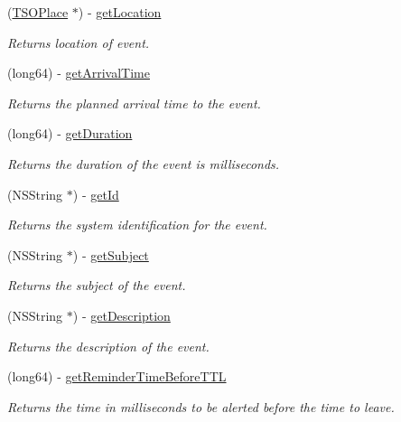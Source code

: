 \begin{DoxyCompactItemize}
\item 
(\hyperlink{interface_t_s_o_place}{T\+S\+O\+Place} $\ast$) -\/ \hyperlink{protocol_i_event-p_af2043ccd14d1f83ffa8cfe41d7fb8f36}{get\+Location}
\begin{DoxyCompactList}\small\item\em Returns location of event. \end{DoxyCompactList}\item 
(long64) -\/ \hyperlink{protocol_i_event-p_a6cf40b28e45bb8daf220634719789257}{get\+Arrival\+Time}
\begin{DoxyCompactList}\small\item\em Returns the planned arrival time to the event. \end{DoxyCompactList}\item 
(long64) -\/ \hyperlink{protocol_i_event-p_a577cd6d2610ca7df7eef235937fd6105}{get\+Duration}
\begin{DoxyCompactList}\small\item\em Returns the duration of the event is milliseconds. \end{DoxyCompactList}\item 
(N\+S\+String $\ast$) -\/ \hyperlink{protocol_i_event-p_a4af1b5764b650fc600f3042468803f89}{get\+Id}
\begin{DoxyCompactList}\small\item\em Returns the system identification for the event. \end{DoxyCompactList}\item 
(N\+S\+String $\ast$) -\/ \hyperlink{protocol_i_event-p_ab9d37b5bb8ed11ff8e594cfbb4b3839e}{get\+Subject}
\begin{DoxyCompactList}\small\item\em Returns the subject of the event. \end{DoxyCompactList}\item 
(N\+S\+String $\ast$) -\/ \hyperlink{protocol_i_event-p_a65f9e7bbad7339f070ebd608c38540f3}{get\+Description}
\begin{DoxyCompactList}\small\item\em Returns the description of the event. \end{DoxyCompactList}\item 
(long64) -\/ \hyperlink{protocol_i_event-p_a75f19dea05b68025526fc2a6151dd9bb}{get\+Reminder\+Time\+Before\+T\+T\+L}
\begin{DoxyCompactList}\small\item\em Returns the time in milliseconds to be alerted before the time to leave. \end{DoxyCompactList}\item 

\end{DoxyCompactItemize}
